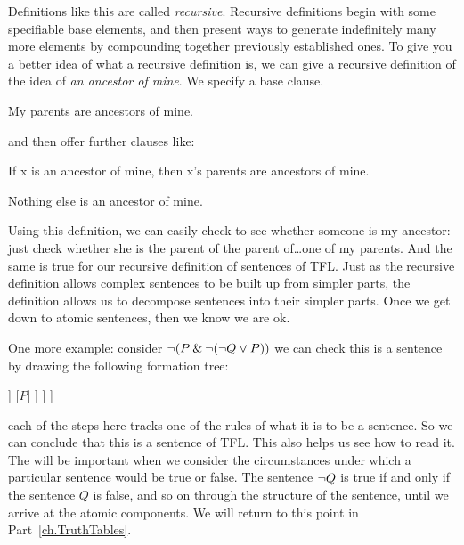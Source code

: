 Definitions like this are called \emph{recursive}. Recursive definitions begin with some specifiable base elements, and then present ways to generate indefinitely many more elements by compounding together previously established ones. To give you a better idea of what a recursive definition is, we can give a recursive definition of the idea of \emph{an ancestor of mine}. We specify a base clause.
	\begin{ebullet}
		\item My parents are ancestors of mine.
	\end{ebullet}
and then offer further clauses like:
	\begin{ebullet}
		\item If x is an ancestor of mine, then x's parents are ancestors of mine.
		\item Nothing else is an ancestor of mine.
	\end{ebullet}
Using this definition, we can easily check to see whether someone is my ancestor: just check whether she is the parent of the parent of\ldots one of my parents. And the same is true for our recursive definition of sentences of TFL. Just as the recursive definition allows complex sentences to be built up from simpler parts, the definition allows us to decompose sentences into their simpler parts. Once we get down to atomic sentences, then we know we are ok.



One more example: consider $\neg (P \mathbin{\&} \neg (\neg Q \vee P))$ we can check this is a sentence by drawing the following formation tree:
\label{S:formationtree}
\begin{center}
\begin{forest}
	[$\mainconnective{\enot}\,  (P \eand \enot (\enot Q \eor P))$
		[$(P \,\mainconnective{\eand}\,  \enot (\enot Q \eor P))$
			[$P$]
			[$\mainconnective{\enot}\,   (\enot Q\eor P)$
				[$\mainconnective{\enot}\,   Q$
					[$Q$]
				]
				[$P$]
			]
		]
	]
\end{forest}
\end{center}
each of the steps here tracks one of the rules of what it is to be a sentence. So we can conclude that this is a sentence of TFL. This also helps us see how to read it.
The will be important when we consider the circumstances under which a particular sentence would be true or false. The sentence $\neg Q$ is true if and only if the sentence $Q$ is false, and so on through the structure of the sentence, until we arrive at the atomic components. We will return to this point in Part~\ref{ch.TruthTables}.

